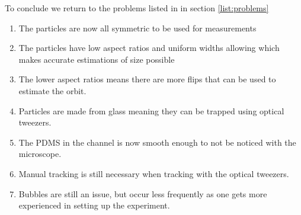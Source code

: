 To conclude we return to the problems listed in in section \ref{list:problems} 

\begin{enumerate} \label{list:solutions}
	\item The particles are now all symmetric to be used for measurements
	\item The particles have low aspect ratios and uniform widths allowing which makes accurate estimations of size possible
	\item The lower aspect ratios means there are more flips that can be used to estimate the orbit.
	\item Particles are made from glass meaning they can be trapped using optical tweezers.
	\item The PDMS in the channel is now smooth enough to not be noticed with the microscope.
	\item Manual tracking is still necessary when tracking with the optical tweezers.
	\item Bubbles are still an issue, but occur less frequently as one gets more experienced in setting up the experiment.
\end{enumerate}
